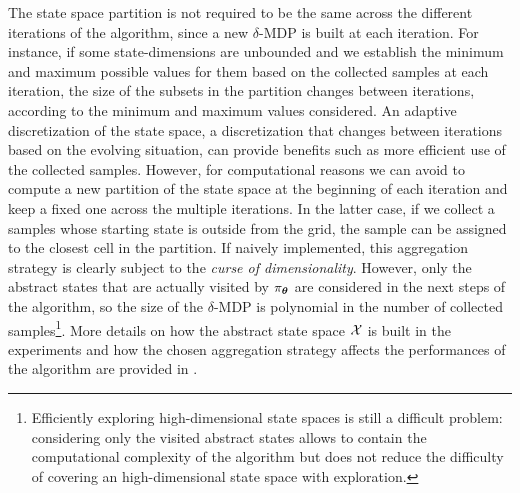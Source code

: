 \newline
The state space partition is not required to be the same across the different iterations of the algorithm, since a new $\delta$-MDP is built at each iteration. For instance, if some state-dimensions are unbounded and we establish the minimum and maximum possible values for them based on the collected samples at each iteration, the size of the subsets in the partition changes between iterations, according to the minimum and maximum values considered. An adaptive discretization of the state space, \ie a discretization that changes between iterations based on the evolving situation, can provide benefits such as more efficient use of the collected samples. However, for computational reasons we can avoid to compute a new partition of the state space at the beginning of each iteration and keep a fixed one across the multiple iterations. In the latter case, if we collect a samples whose starting state is outside from the grid, the sample can be assigned to the closest cell in the partition.
If naively implemented, this aggregation strategy is clearly subject to the \textit{curse of dimensionality}. However, only the abstract states that are actually visited by $\pi_{\boldsymbol{\theta}}$ are considered in the next steps of the algorithm, so the size of the $\delta$-\ac{MDP} is polynomial in the number of collected samples\footnote{Efficiently exploring high-dimensional state spaces is still a difficult problem: considering only the visited abstract states allows to contain the computational complexity of the algorithm but does not reduce the difficulty of covering an high-dimensional state space with exploration.}.  
More details on how the abstract state space $\mathcal{X}$ is built in the experiments and how the chosen aggregation strategy affects the performances of the algorithm are provided in .

